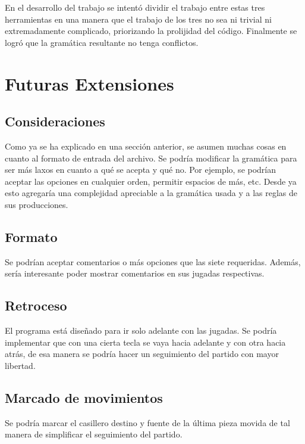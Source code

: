 \documentclass[a4paper,10pt]{article}
\begin{document}
En el desarrollo del trabajo se intentó dividir el trabajo entre estas tres herramientas en una manera que el trabajo de los tres no sea ni trivial ni 
extremadamente complicado, priorizando la prolijidad del código. Finalmente se logró que la gramática resultante no tenga conflictos.


\newpage

\section{Futuras Extensiones}

\subsection{ Consideraciones }

Como ya se ha explicado en una sección anterior, se asumen muchas cosas en cuanto al formato de entrada del archivo. Se podría modificar la gramática para 
ser más laxos en cuanto a qué se acepta y qué no. Por ejemplo, se podrían aceptar las opciones en cualquier orden, permitir espacios de más, etc. Desde ya 
esto agregaría una complejidad apreciable a la gramática usada y a las reglas de sus producciones.

\subsection{ Formato }

Se podrían aceptar comentarios o más opciones que las siete requeridas. Además, sería interesante poder mostrar comentarios en sus jugadas respectivas. 

\subsection{ Retroceso }

El programa está diseñado para ir solo adelante con las jugadas. Se podría implementar que con una cierta tecla se vaya hacia adelante y con otra hacia atrás, 
de esa manera se podría hacer un seguimiento del partido con mayor libertad.

\subsection{ Marcado de movimientos }

Se podría marcar el casillero destino y fuente de la última pieza  movida de tal manera de simplificar el seguimiento del partido.
   
\end{document}

